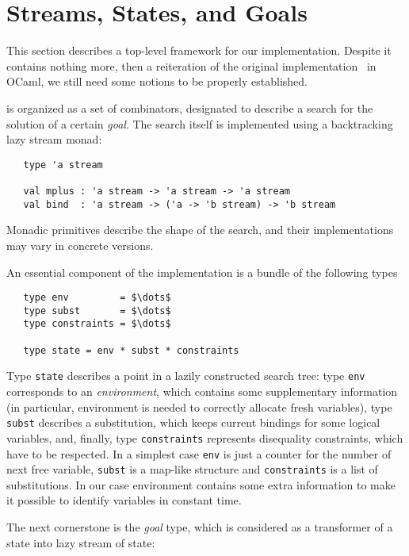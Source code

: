 \section{Streams, States, and Goals}
\label{sec:goals}

This section describes a top-level framework for our implementation. Despite it contains
nothing more, then a reiteration of the original implementation~\cite{MicroKanren, CKanren} 
in OCaml, we still need some notions to be properly established.

\miniKanren is organized as a set of combinators, designated to describe a search for
the solution of a certain \emph{goal}. The search itself is implemented using a
backtracking lazy stream monad:

\begin{lstlisting}
   type 'a stream

   val mplus : 'a stream -> 'a stream -> 'a stream
   val bind  : 'a stream -> ('a -> 'b stream) -> 'b stream
\end{lstlisting}

Monadic primitives describe the shape of the search, and their implementations may 
vary in concrete \miniKanren versions.

An essential component of the implementation is a bundle of the following types

\begin{lstlisting}
   type env         = $\dots$
   type subst       = $\dots$
   type constraints = $\dots$

   type state = env * subst * constraints
\end{lstlisting}

Type \lstinline{state} describes a point in a lazily constructed search tree: type \lstinline{env} corresponds 
to an \emph{environment}, which contains some supplementary information (in particular, environment is needed to
correctly allocate fresh variables), type \lstinline{subst} describes a substitution, which keeps current bindings 
for some logical variables, and, finally, type \lstinline{constraints} represents disequality constraints, 
which have to be respected. In a simplest case \lstinline{env} is just a counter for the number of next free
variable, \lstinline{subst} is a map-like structure and \lstinline{constraints} is a list of substitutions. In our
case environment contains some extra information to make it possible to identify variables in constant time.

The next cornerstone is the \emph{goal} type, which is considered as a transformer of a state into 
lazy stream of state:

